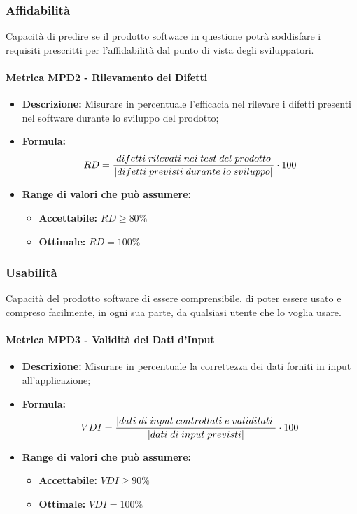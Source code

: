 \subsubsection{Affidabilità} 
Capacità di predire se il prodotto software in questione potrà soddisfare i requisiti prescritti per l'affidabilità dal punto di vista degli sviluppatori.

\paragraph{Metrica MPD2 - Rilevamento dei Difetti} 
\begin{itemize}
    \item \textbf{Descrizione:} Misurare in percentuale l'efficacia nel rilevare i difetti presenti nel software durante lo sviluppo del prodotto;
    \item \textbf{Formula:} $$RD = {|difetti \; rilevati \; nei \; test \; del \; prodotto| \over |difetti \; previsti \; durante \; lo \; sviluppo|} \cdot 100 $$
	\item \textbf{Range di valori che può assumere:}
    \begin{itemize}
        \item \textbf{Accettabile:} $RD \geq 80\% $
        \item \textbf{Ottimale:} $RD = 100\%$
    \end{itemize}
\end{itemize}

\subsubsection{Usabilità} 
Capacità del prodotto software di essere comprensibile, di poter essere usato e compreso facilmente, in ogni sua parte, da qualsiasi utente che lo voglia usare.\\
\paragraph{Metrica MPD3 - Validità dei Dati d'Input} 
\begin{itemize}
    \item \textbf{Descrizione:} Misurare in percentuale la correttezza dei dati forniti in input all'applicazione;
	\item \textbf{Formula:} $$VDI = {|dati \; di \; input \; controllati \; e \; validitati| \over |dati \; di \; input \; previsti|} \cdot 100$$  
    \item \textbf{Range di valori che può assumere:}
    \begin{itemize}
        \item \textbf{Accettabile:} $VDI \geq 90\%$
        \item \textbf{Ottimale:} $VDI = 100\%$
    \end{itemize}
\end{itemize}

